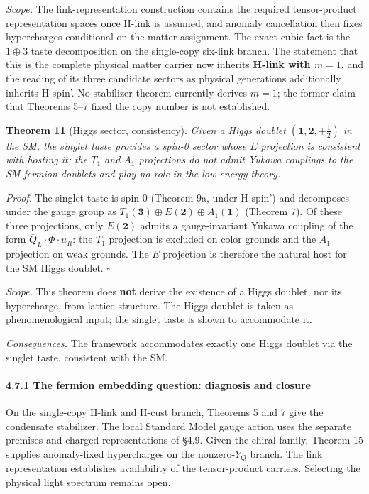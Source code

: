 \documentclass[
]{article}
\begin{document}
\emph{Scope.} The link-representation construction contains the required
tensor-product representation spaces once H-link is assumed, and anomaly
cancellation then fixes hypercharges conditional on the matter
assignment. The exact cubic fact is the \(1\oplus3\) taste decomposition
on the single-copy six-link branch. The statement that this is the
complete physical matter carrier now inherits \textbf{H-link with
\(m=1\)}, and the reading of its three candidate sectors as physical
generations additionally inherits H-spin'. No stabilizer theorem
currently derives \(m=1\); the former claim that Theorems 5--7 fixed the
copy number is not established.

\textbf{Theorem 11} (Higgs sector, consistency). \emph{Given a Higgs
doublet \((\mathbf{1}, \mathbf{2}, +\tfrac{1}{2})\) in the SM, the
singlet taste provides a spin-0 sector whose \(E\) projection is
consistent with hosting it; the \(T_1\) and \(A_1\) projections do not
admit Yukawa couplings to the SM fermion doublets and play no role in
the low-energy theory.}

\emph{Proof.} The singlet taste is spin-0 (Theorem 9a, under H-spin')
and decomposes under the gauge group as
\(T_1(\mathbf{3}) \oplus E(\mathbf{2}) \oplus A_1(\mathbf{1})\) (Theorem
7). Of these three projections, only \(E(\mathbf{2})\) admits a
gauge-invariant Yukawa coupling of the form
\(\bar Q_L \cdot \Phi \cdot u_R\): the \(T_1\) projection is excluded on
color grounds and the \(A_1\) projection on weak grounds. The \(E\)
projection is therefore the natural host for the SM Higgs doublet.
\(\square\)

\emph{Scope.} This theorem does \textbf{not} derive the existence of a
Higgs doublet, nor its hypercharge, from lattice structure. The Higgs
doublet is taken as phenomenological input; the singlet taste is shown
to accommodate it.

\emph{Consequences.} The framework accommodates exactly one Higgs
doublet via the singlet taste, consistent with the SM.

\hypertarget{the-fermion-embedding-question-diagnosis-and-closure}{%
\paragraph{4.7.1 The fermion embedding question: diagnosis and
closure}\label{the-fermion-embedding-question-diagnosis-and-closure}}

On the single-copy H-link and H-cust branch, Theorems 5 and 7 give the
condensate stabilizer. The local Standard Model gauge action uses the
separate premises and charged representations of §4.9. Given the chiral
family, Theorem 15 supplies anomaly-fixed hypercharges on the
nonzero-\(Y_Q\) branch. The link representation establishes availability
of the tensor-product carriers. Selecting the physical light spectrum
remains open.
\end{document}
